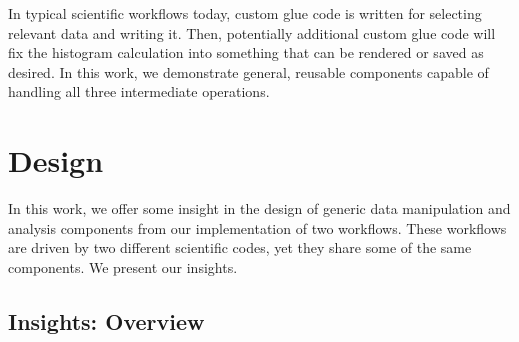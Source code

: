 \documentclass[conference]{IEEEtran}
\begin{document}

In typical scientific workflows today, custom glue code is written for
selecting relevant data and writing it.
Then, potentially additional
custom glue code will fix the histogram calculation into something that can be
rendered or saved as desired.  In this work, we demonstrate general, reusable
components capable of handling all three intermediate operations.

%

\section{Design}
\label{s:design}

In this work, we offer some insight in the design of generic data manipulation
and analysis components from our implementation of two workflows. These
workflows are driven by two different scientific codes, yet they share some of
the same components.
We present our insights.

\subsection{Insights: Overview}
\end{document}

